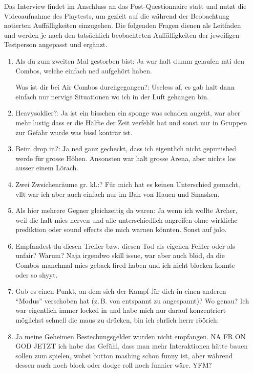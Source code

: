 \documentclass[../Main.tex]{subfiles}
\begin{document}
Das Interview findet im Anschluss an das Post-Questionnaire statt und nutzt die Videoaufnahme des Playtests, um gezielt auf die während der Beobachtung notierten Auffälligkeiten einzugehen. Die folgenden Fragen dienen als Leitfaden und werden je nach den tatsächlich beobachteten Auffälligkeiten der jeweiligen Testperson angepasst und ergänzt.

\begin{enumerate}[label=\textbf{I\arabic*}, leftmargin=1.5cm, itemsep=0.5em]
\item Als du zum zweiten Mal gestorben bist: Ja war halt dumm gelaufen mti den Combos, welche einfach ned aufgehört haben.

Was ist dir bei Air Combos durchgegangen?: Useless af, es gab halt dann einfach nur nervige Situationen wo ich in der Luft gehangen bin.

\item Heavysoldier?: Ja ist ein bisschen ein sponge was schaden angeht, war aber mehr lustig dass er die Hälfte der Zeit verfehlt hat und sonst nur in Gruppen zur Gefahr wurde was bissl konträr ist.
\item Beim drop in?: Ja ned ganz gecheckt, dass ich eigentlich nicht gepunished werde für grosse Höhen. Ansonsten war halt grosse Arena, aber nichts los ausser einem Lörach.
\item Zwei Zwsichenräume gr. kl.:? Für mich hat es keinen Unterschied gemacht, vllt war ich aber auch einfach nur im Ban von Hauen und Smashen.
\item Als hier mehrere Gegner gleichzeitig da waren: Ja wenn ich wollte Archer, weil die halt mies nerven und alle unterschiedlich angreifen ohne wirkliche prediktion oder sound effects die mich warnen könnten. Sonst auf jolo.
\item Empfandest du diesen Treffer bzw. diesen Tod als eigenen Fehler oder als unfair? Warum? Naja irgendwo skill issue, war aber auch blöd, da die Combos manchmal mies geback fired haben und ich nicht blocken konnte oder so shyyt.
\item Gab es einen Punkt, an dem sich der Kampf für dich in einen anderen \enquote{Modus} verschoben hat (z.\,B. von entspannt zu angespannt)? Wo genau?
Ich war eigentlich immer locked in und habe mich nur darauf konzentriert möglichst schnell die maus zu drücken, bin ich ehrlich herrr röörich.
\item Ja meine Geheimen Bestechungsgelder wurden nicht empfangen. NA FR ON GOD JETZT ich habe das Gefühl, dass man mehr Interaktionen hätte bauen sollen zum spielen, wobei button mashing schon funny ist, aber während dessen auch noch block oder dodge roll noch funnier wäre. YFM?
\end{enumerate}
\end{document}
